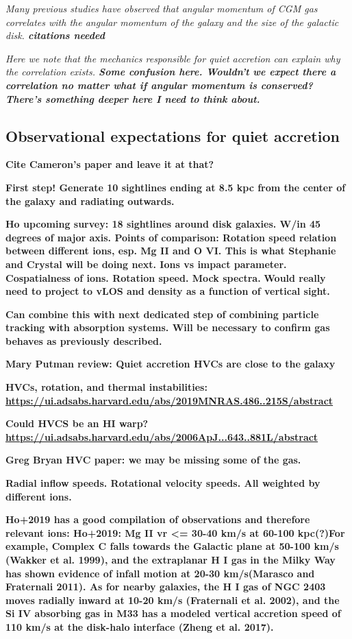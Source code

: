 \documentclass[fleqn,usenatbib]{mnras}
\begin{document}
\textit{
Many previous studies have observed that angular momentum of CGM gas correlates with the angular momentum of the galaxy and the size of the galactic disk.
\textbf{citations needed}
}

\textit{
Here we note that the mechanics responsible for quiet accretion can explain why the correlation exists.
\textbf{Some confusion here. Wouldn't we expect there a correlation no matter what if angular momentum is conserved? There's something deeper here I need to think about.}
}

\subsection{Observational expectations for quiet accretion}
\label{s: observational expectations}

\textbf{
Cite Cameron's paper and leave it at that?
}

\textbf{
First step!
Generate 10 sightlines ending at 8.5 kpc from the center of the galaxy and radiating outwards.
}

\textbf{
Ho upcoming survey:
18 sightlines around disk galaxies.
W/in 45 degrees of major axis.
Points of comparison:
Rotation speed relation between different ions, esp. Mg II and O VI. This is what Stephanie and Crystal will be doing next.
Ions vs impact parameter.
Cospatialness of ions.
Rotation speed.
Mock spectra.
}
\textbf{
Would really need to project to vLOS and density as a function of vertical sight.
}

\textbf{
Can combine this with next dedicated step of combining particle tracking with absorption systems.
Will be necessary to confirm gas behaves as previously described.
}

\textbf{Mary Putman review:
Quiet accretion
HVCs are close to the galaxy}

\textbf{HVCs, rotation, and thermal instabilities:
\url{https://ui.adsabs.harvard.edu/abs/2019MNRAS.486..215S/abstract}
}

\textbf{
Could HVCS be an HI warp?
\url{https://ui.adsabs.harvard.edu/abs/2006ApJ...643..881L/abstract}
}

\textbf{
Greg Bryan HVC paper:
we may be missing some of the gas.
}

\textbf{
Radial inflow speeds.
Rotational velocity speeds.
All weighted by different ions.
}

\textbf{
Ho+2019 has a good compilation of observations and therefore relevant ions:
Ho+2019:
Mg II vr <= 30-40 km/s at 60-100 kpc(?)For example, Complex C falls towards the Galactic plane at 50-100 km/s (Wakker et al. 1999), and the extraplanar H I gas in the Milky Way has shown evidence of infall motion at 20-30 km/s(Marasco and Fraternali 2011).
As for nearby galaxies, the H I gas of NGC 2403 moves radially inward at 10-20 km/s (Fraternali et al. 2002), and the Si IV absorbing gas in M33 has a modeled vertical accretion speed of 110 km/s at the disk-halo interface (Zheng et al. 2017).
}
\end{document}

